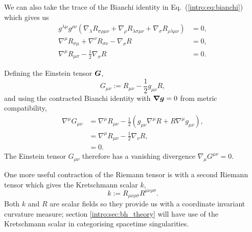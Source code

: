 We can also take the trace of the Bianchi identity in Eq.~(\ref{intro:eq:bianchi}) which gives us
\begin{align}
g^{\lambda\mu}g^{\rho\nu} (\nabla_\lambda R_{\sigma\rho\mu\nu} + \nabla_\rho R_{\lambda\sigma\mu\nu} + \nabla_\sigma R_{\rho\lambda\mu\nu}) &= 0 , \\
 \nabla^\mu R_{\sigma\mu} + \nabla^\nu R_{\sigma\nu} - \nabla_\sigma R &= 0 , \\
 \nabla^\mu R_{\mu\sigma} - \frac{1}{2}\nabla_\sigma R&=0.
\end{align}

Defining the Einstein tensor $\boldsymbol{G}$,
\begin{equation}
G_{\mu\nu} := R_{\mu\nu} - \frac{1}{2}g_{\mu\nu}R,
\end{equation}
and using the contracted Bianchi identity with $\boldsymbol{\nabla}\boldsymbol{g}=0$ from metric compatibility,
\begin{align}
\nabla^\mu G_{\mu\nu} &= \nabla^\mu R_{\mu\nu} - \frac{1}{2}\left(g_{\mu\nu}\nabla^\mu R + R\nabla^\mu g_{\mu\nu}\right) ,\\
&= \nabla^\mu R_{\mu\nu} - \frac{1}{2}\nabla_\nu R  ,\label{intro:eq:einstein_tensor_div}\\
&=0.
\end{align}
The Einstein tensor $G_{\mu\nu}$ therefore has a vanishing divergence $\nabla_\mu G^{\mu\nu}=0$.

One more useful contraction of the Riemann tensor is with a second Riemann tensor which gives the Kretschmann scalar $k$,
\begin{equation} \label{intro:eq:Kretschdef}
k := R_{\mu\nu\rho\sigma}R^{\mu\nu\rho\sigma}.
\end{equation}
Both $k$ and $R$ are scalar fields so they provide us with a coordinate invariant curvature measure; section \ref{intro:sec:bh_theory} will have use of the Kretschmann scalar in categorising spacetime singularities.





